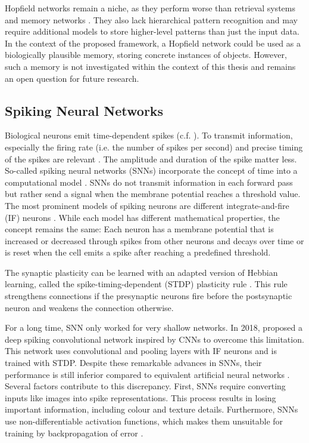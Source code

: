 Hopfield networks remain a niche, as they perform worse than retrieval systems  and memory networks .
They also lack hierarchical pattern recognition and may require additional models to store higher-level patterns than just the input data.
In the context of the proposed framework, a Hopfield network could be used as a biologically plausible memory, storing concrete instances of objects.
However, such a memory is not investigated within the context of this thesis and remains an open question for future research.


\subsection{Spiking Neural Networks}
Biological neurons emit time-dependent spikes (c.f. ).
To transmit information, especially the firing rate (i.e. the number of spikes per second) and precise timing of the spikes are relevant .
The amplitude and duration of the spike matter less.
So-called spiking neural networks (SNNs) incorporate the concept of time into a computational model .
SNNs do not transmit information in each forward pass but rather send a signal when the membrane potential reaches a threshold value. 
The most prominent models of spiking neurons are different integrate-and-fire (IF) neurons \cite{abbott_lapicques_1999, izhikevich_simple_2003, brette_adaptive_2005}.
While each model has different mathematical properties, the concept remains the same: Each neuron has a membrane potential that is increased or decreased through spikes from other neurons and decays over time or is reset when the cell emits a spike after reaching a predefined threshold.

The synaptic plasticity can be learned with an adapted version of Hebbian learning, called the spike-timing-dependent (STDP) plasticity rule .
This rule strengthens connections if the presynaptic neurons fire before the postsynaptic neuron and weakens the connection otherwise.

For a long time, SNN only worked for very shallow networks.
In 2018,  proposed a deep spiking convolutional network inspired by CNNs to overcome this limitation.
This network uses convolutional and pooling layers with IF neurons and is trained with STDP.
Despite these remarkable advances in SNNs, their performance is still inferior compared to equivalent artificial neural networks . Several factors contribute to this discrepancy. First, SNNs require converting inputs like images into spike representations.
This process results in losing important information, including colour and texture details. Furthermore, SNNs use non-differentiable activation functions, which makes them unsuitable for training by backpropagation of error \cite{nunes_spiking_2022}.

